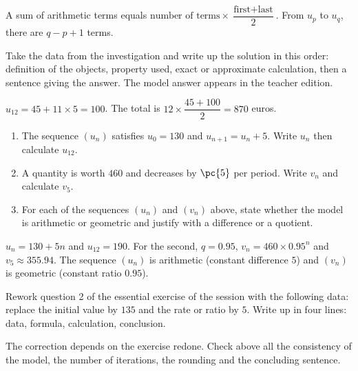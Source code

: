 \begin{summary}A sum of arithmetic terms equals $\text{number of terms}\times\dfrac{\text{first}+\text{last}}2$. From $u_p$ to $u_q$, there are $q-p+1$ terms.\end{summary}

\begin{example}
Take the data from the investigation and write up the solution in this order: definition of the objects, property used, exact or approximate calculation, then a sentence giving the answer. The model answer appears in the teacher edition.
\end{example}
\begin{solution}$u_{12}=45+11\times5=100$. The total is $12\times\dfrac{45+100}{2}=870$ euros.\end{solution}

\begin{exercise}[essential]
\begin{enumerate}\item The sequence $(u_n)$ satisfies $u_0=130$ and $u_{n+1}=u_n+5$. Write $u_n$ then calculate $u_{12}$.\item A quantity is worth $460$ and decreases by $\pc{5}$ per period. Write $v_n$ and calculate $v_5$.\item For each of the sequences $(u_n)$ and $(v_n)$ above, state whether the model is arithmetic or geometric and justify with a difference or a quotient.\end{enumerate}
\end{exercise}
\begin{solution}$u_n=130+5n$ and $u_{12}=190$. For the second, $q=\num{0,95}$, $v_n=460\times\num{0,95}^n$ and $v_5\approx\num{355,94}$. The sequence $(u_n)$ is arithmetic (constant difference $5$) and $(v_n)$ is geometric (constant ratio $\num{0,95}$).\end{solution}


\begin{homework}Rework question 2 of the essential exercise of the session with the following data: replace the initial value by $135$ and the rate or ratio by $5$. Write up in four lines: data, formula, calculation, conclusion.\end{homework}
\begin{solution}The correction depends on the exercise redone. Check above all the consistency of the model, the number of iterations, the rounding and the concluding sentence.\end{solution}

